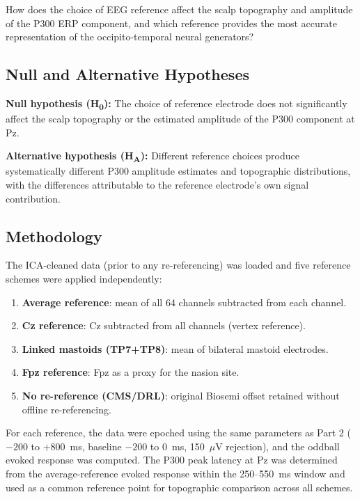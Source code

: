 \documentclass[11pt, a4paper, twocolumn]{article}
\begin{document}
How does the choice of EEG reference affect the scalp topography and
amplitude of the P300 ERP component, and which reference provides the
most accurate representation of the occipito-temporal neural generators?

\subsection{Null and Alternative Hypotheses}

\textbf{Null hypothesis (H\textsubscript{0}):} The choice of reference
electrode does not significantly affect the scalp topography or the
estimated amplitude of the P300 component at Pz.

\textbf{Alternative hypothesis (H\textsubscript{A}):} Different reference
choices produce systematically different P300 amplitude estimates and
topographic distributions, with the differences attributable to the
reference electrode's own signal contribution.

\subsection{Methodology}

The ICA-cleaned data (prior to any re-referencing) was loaded and five
reference schemes were applied independently:

\begin{enumerate}\setlength{\itemsep}{1pt}\setlength{\parskip}{0pt}
    \item \textbf{Average reference}: mean of all 64 channels subtracted from each channel.
    \item \textbf{Cz reference}: Cz subtracted from all channels (vertex reference).
    \item \textbf{Linked mastoids (TP7+TP8)}: mean of bilateral mastoid electrodes.
    \item \textbf{Fpz reference}: Fpz as a proxy for the nasion site.
    \item \textbf{No re-reference (CMS/DRL)}: original Biosemi offset retained without offline re-referencing.
\end{enumerate}

For each reference, the data were epoched using the same parameters as
Part 2 ($-200$ to $+800$~ms, baseline $-200$ to $0$~ms, 150~$\mu$V
rejection), and the oddball evoked response was computed. The P300 peak
latency at Pz was determined from the average-reference evoked response
within the 250--550~ms window and used as a common reference point for
topographic comparison across all schemes.
\end{document}
